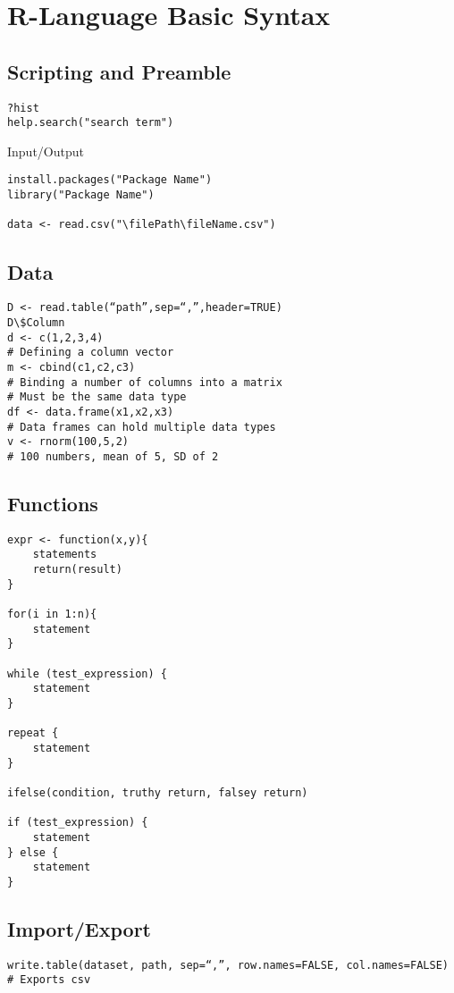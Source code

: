 \documentclass[]{article}
\title{}
\author{}
\begin{document}
\section{R-Language Basic Syntax}
\subsection{Scripting and Preamble}
	\begin{verbatim}
?hist
help.search("search term")
	\end{verbatim}
Input/Output
	\begin{verbatim}
install.packages("Package Name")
library("Package Name")

data <- read.csv("\filePath\fileName.csv")
	\end{verbatim}

\subsection{Data}
	\begin{verbatim}
D <- read.table(“path”,sep=“,”,header=TRUE)
D\$Column
d <- c(1,2,3,4)
# Defining a column vector
m <- cbind(c1,c2,c3)
# Binding a number of columns into a matrix
# Must be the same data type
df <- data.frame(x1,x2,x3)
# Data frames can hold multiple data types
v <- rnorm(100,5,2)
# 100 numbers, mean of 5, SD of 2
	\end{verbatim}

\subsection{Functions}
	\begin{verbatim}
expr <- function(x,y){
	statements
	return(result)
}

for(i in 1:n){
	statement
}

while (test_expression) {
	statement
}

repeat {
	statement
}

ifelse(condition, truthy return, falsey return)

if (test_expression) {
	statement
} else {
	statement
}
	\end{verbatim}

\subsection{Import/Export}
	\begin{verbatim}
write.table(dataset, path, sep=“,”, row.names=FALSE, col.names=FALSE)
# Exports csv
	\end{verbatim}
\end{document}
